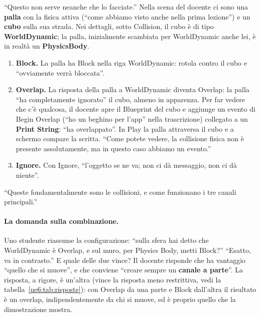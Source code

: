 ``Questo non serve neanche che lo facciate.'' Nella scena del docente ci sono una
\textbf{palla} con la fisica attiva (``come abbiamo visto anche nella prima lezione'') e
un \textbf{cubo} sulla sua strada. Nei dettagli, sotto Collision, il cubo è di tipo
\textbf{WorldDynamic}; la palla, inizialmente scambiata per WorldDynamic anche lei, è in
realtà un \textbf{PhysicsBody}.
\begin{enumerate}
  \item \textbf{Block.} La palla ha Block nella riga WorldDynamic: rotola contro il
        cubo e ``ovviamente verrà bloccata''.
  \item \textbf{Overlap.} La risposta della palla a WorldDynamic diventa Overlap: la
        palla ``ha completamente ignorato'' il cubo, almeno in apparenza. Per far vedere
        che c'è qualcosa, il docente apre il Blueprint del cubo e aggiunge un evento di
        Begin Overlap (``ho un beghino per l'app'' nella trascrizione) collegato a un
        \textbf{Print String}: ``ha overlappato''. In Play la palla attraversa il cubo e
        a schermo compare la scritta. ``Come potete vedere, la collisione fisica non è
        presente assolutamente, ma in questo caso abbiamo un evento.''
  \item \textbf{Ignore.} Con Ignore, ``l'oggetto se ne va; non ci dà messaggio, non ci
        dà niente''.
\end{enumerate}
``Queste fondamentalmente sono le collisioni, e come funzionano i tre canali
principali.''

\paragraph{La domanda sulla combinazione.} Uno studente riassume la configurazione:
``sulla sfera hai detto che WorldDynamic è Overlap, e sul muro, per Physics Body, metti
Block?'' ``Esatto, va in contrasto.'' E quale delle due vince? Il docente risponde che
ha vantaggio ``quello che si muove'', e che conviene ``creare sempre un \textbf{canale a
parte}''. La risposta, a rigore, è un'altra (vince la risposta meno restrittiva, vedi la
tabella~\ref{ue6:tab:risposte}): con Overlap da una parte e Block dall'altra il risultato
è un overlap, indipendentemente da chi si muove, ed è proprio quello che la dimostrazione
mostra.

